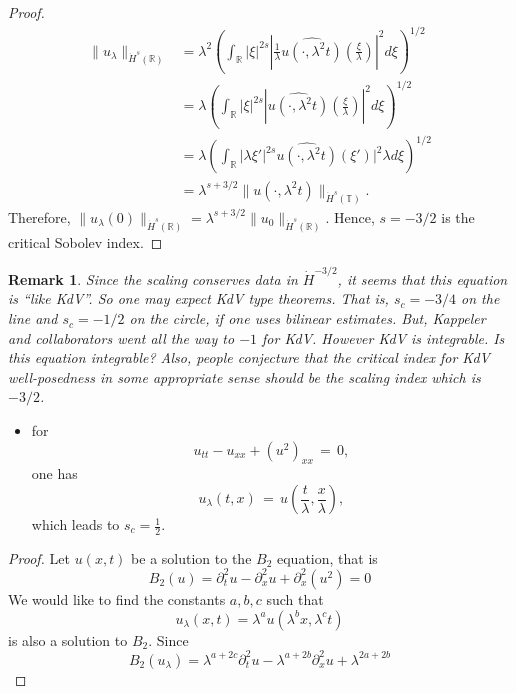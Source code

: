 \documentclass[12pt,reqno]{amsart}
\numberwithin{equation}{section}  %
\newcommand{\rr}{\mathbb{R}}
\newcommand{\ci}{\mathbb{T}}
\newcommand{\wh}{\widehat}
\newtheorem{remark}[theorem]{Remark}
\begin{document}
\begin{appendices}
\begin{proof}
%
%
\begin{equation*}
\begin{split}
  \| u_{\lambda} \|_{\dot{H}^s(\rr)} 
  & = \lambda^{2} \left( \int_{\rr} | \xi |^{2s} |
  \frac{1}{\lambda}\wh{u(\cdot, \lambda^{2}t)}(\frac{\xi}{\lambda}) |^2 d \xi
  \right)^{1/2}
  \\
  & = \lambda \left( \int_{\rr}| \xi |^{2s} | \wh{u(\cdot,
  \lambda^{2}t)}(\frac{\xi}{\lambda}) |^2 d \xi  \right)^{1/2}
  \\
  & = \lambda \left( \int_{\rr} | \lambda \xi' |^{2s} 
  \wh{u(\cdot, \lambda^{2}t)}(\xi') |^2 \lambda d \xi
  \right)^{1/2}
  \\
  & = \lambda^{s + 3/2} \|u(\cdot, \lambda^{2}t) \|_{\dot{H}^s (\ci)}.
\end{split}
\end{equation*}
%
%
Therefore, $\| u_{\lambda}(0) \|_{\dot{H}^s(\rr)} = \lambda^{s + 3/2} \|
u_{0} \|_{\dot{H}^{s}(\rr)}$. Hence, $s=-3/2$ is the critical Sobolev index.
\end{proof}
%
%
\begin{framed}
\begin{remark}
Since the scaling conserves data in $\dot{H}^{-3/2}$, it
seems that this equation is ``like KdV''.
So one may expect KdV type theorems.
That is, $s_c=-3/4$ on the line and $s_c=-1/2$ on the circle,
if one uses bilinear estimates.
But, Kappeler and collaborators went all the way to $-1$ for KdV.
However KdV is integrable. Is this equation integrable?
Also, people conjecture that the critical index for KdV well-posedness 
in some appropriate sense should be the scaling index which is  $-3/2$.
\label{rem:kdv-like}
\end{remark}
\end{framed}
%
%
\begin{itemize}
  \item for 
    \[
    u_{tt}-u_{xx}+(u^2)_{xx}\,=\,0,
    \]
    one has 
    \[
    u_{\lambda}(t,x)\,=\,u\left(\frac{t}{\lambda}, \frac{x}{\lambda}\right),
    \]
    which leads to $s_c=\frac 12$.
\end{itemize}
\begin{proof}
Let $u(x, t)$ be a solution to the $B_2$ equation, that is
%
$$
B_2(u)=
 \partial_t^2u - \partial^2_x u + \partial_x^2(u^2)  = 0
$$
%
We would like to find the constants
$a, b, c$ such that
\[
u_\lambda (x, t) = \lambda^a u(\lambda^b x, \lambda^c t)
\]
is also a solution to $B_2$.  Since 
$$
B_2(u_\lambda)=
\lambda^{a+2c} \partial_t^2u 
-
 \lambda^{a+2b} \partial^2_x u 
 +
  \lambda^{2a+2b}
$$
\end{proof}
\end{appendices}
\end{document}
